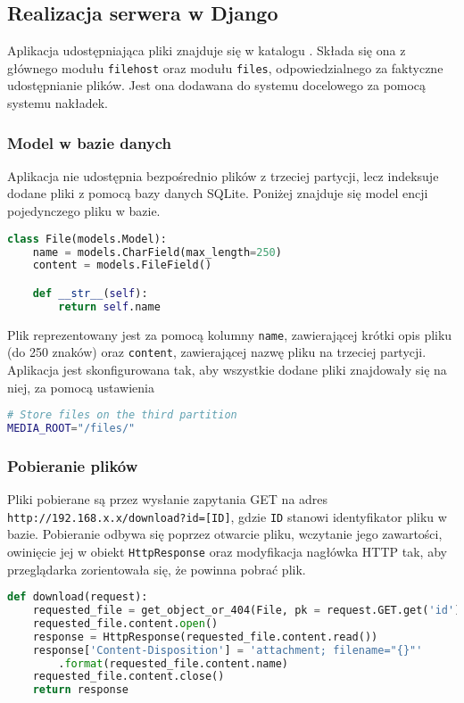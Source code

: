 \documentclass[10pt,a4paper]{article}
\begin{document}
\subsection{Realizacja serwera w Django}

Aplikacja udostępniająca pliki znajduje się w katalogu
.
Składa się ona z głównego modułu \texttt{filehost} oraz modułu \texttt{files},
odpowiedzialnego za faktyczne udostępnianie plików. Jest ona dodawana do systemu docelowego
za pomocą systemu nakładek.

\subsubsection{Model w bazie danych}

Aplikacja nie udostępnia bezpośrednio plików z trzeciej partycji, lecz indeksuje dodane pliki
z pomocą bazy danych SQLite. Poniżej znajduje się model encji pojedynczego pliku w bazie.

\begin{lstlisting}[language=python,caption=Model encji \texttt{File}]
class File(models.Model):
    name = models.CharField(max_length=250)
    content = models.FileField()

    def __str__(self):
        return self.name
\end{lstlisting}

Plik reprezentowany jest za pomocą kolumny \texttt{name}, zawierającej krótki opis pliku (do 250
znaków) oraz \texttt{content}, zawierającej nazwę pliku na trzeciej partycji. Aplikacja jest
skonfigurowana tak, aby wszystkie dodane pliki znajdowały się na niej, za pomocą ustawienia
\begin{lstlisting}[language=bash,caption=Opcja w \directory{filehost/settings.py} ustawiająca lokalizację dodanych plików]
# Store files on the third partition
MEDIA_ROOT="/files/"
\end{lstlisting}

\subsubsection{Pobieranie plików}

Pliki pobierane są przez wysłanie zapytania GET na adres \texttt{http://192.168.x.x/download?id=[ID]},
gdzie \texttt{ID} stanowi identyfikator pliku w bazie. Pobieranie odbywa się poprzez otwarcie pliku,
wczytanie jego zawartości, owinięcie jej w obiekt \texttt{HttpResponse} oraz modyfikacja
nagłówka HTTP tak, aby przeglądarka zorientowała się, że powinna pobrać plik.
\begin{lstlisting}[language=python,caption=Widok w \directory{files/views.py} odpowiadający za pobieranie plików]
def download(request):
    requested_file = get_object_or_404(File, pk = request.GET.get('id'))
    requested_file.content.open()
    response = HttpResponse(requested_file.content.read())
    response['Content-Disposition'] = 'attachment; filename="{}"'
    	.format(requested_file.content.name)
    requested_file.content.close()
    return response
\end{lstlisting}
\end{document}

